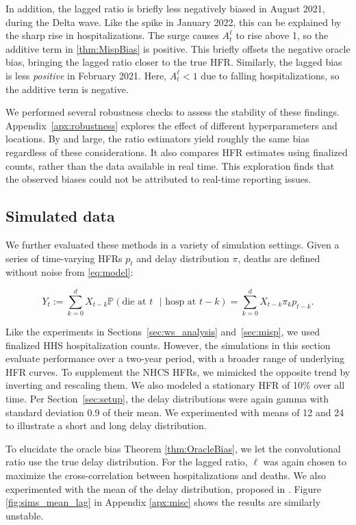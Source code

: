 \documentclass{article}
\begin{document}
In addition, the lagged ratio is briefly less negatively biased in August 2021, during the Delta wave. Like the spike in January 2022, this can be explained by the sharp rise in hospitalizations. The surge causes $A_t^\ell$ to rise above 1, so the additive term in \ref{thm:MispBias} is positive. This briefly offsets the negative oracle bias, bringing the lagged ratio closer to the true HFR. Similarly, the lagged bias is less \textit{positive} in February 2021. Here, $A_t^\ell < 1$ due to falling hospitalizations, so the additive term is negative. 

We performed several robustness checks to assess the stability of these findings. Appendix~\ref{apx:robustness} explores the effect of different hyperparameters and locations. By and large, the ratio estimators yield roughly the same bias regardless of these considerations. It also compares HFR estimates using finalized counts, rather than the data available in real time. This exploration finds that the observed biases could not be attributed to real-time reporting issues. 

\subsection{Simulated data}\label{sec:results_sim}

We further evaluated these methods in a variety of simulation settings. Given a series of time-varying HFRs $p_t$ and delay distribution $\pi$, deaths are defined without noise from \eqref{eq:model}:

$$Y_t := \sum_{k=0}^d X_{t-k} \mathbb{P}(\text{die at $t$ }\vert\text{ hosp at }t-k) = \sum_{k=0}^d X_{t-k} \pi_k p_{t-k}.$$

Like the experiments in Sections~\ref{sec:ws_analysis} and~\ref{sec:misp}, we used finalized HHS hospitalization counts. However, the simulations in this section evaluate performance over a two-year period, with a broader range of underlying HFR curves. To supplement the NHCS HFRs, we mimicked the opposite trend by inverting and rescaling them. We also modeled a stationary HFR of 10\% over all time. Per Section~\ref{sec:setup}, the delay distributions were again gamma with standard deviation 0.9 of their mean. We experimented with means of 12 and 24 to illustrate a short and long delay distribution. 

To elucidate the oracle bias Theorem \ref{thm:OracleBias}, we let the convolutional ratio use the true delay distribution. For the lagged ratio, $\ell$ was again chosen to maximize the cross-correlation between hospitalizations and deaths. We also experimented with the mean of the delay distribution, proposed in \citet{lagged_chinese}. Figure \ref{fig:sims_mean_lag} in Appendix \ref{apx:misc} shows the results are similarly unstable.
\end{document}
